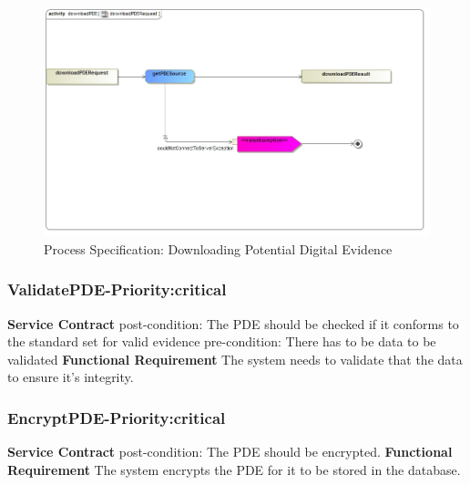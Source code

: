 \documentclass[a4paper,12pt]{article}
\begin{document}
\begin{figure}[H]
\includegraphics[width=\textwidth]{images/downloadPDERequest.jpg}
\caption{Process Specification: Downloading Potential Digital Evidence \label{overflow}}
\end{figure}	
\subsubsection{ValidatePDE-Priority:critical}
\textbf{Service Contract}\newline
post-condition: The PDE should be checked if it conforms to the standard set for valid evidence\newline
pre-condition: There has to be data to be validated\newline
\textbf{Functional Requirement}\newline
The system needs to validate that the data to ensure it's integrity.\newline
\subsubsection{EncryptPDE-Priority:critical}
\textbf{Service Contract}\newline
post-condition: The PDE should be encrypted.\newline
\textbf{Functional Requirement}\newline
	The system encrypts the PDE for it to be stored in the database.\newline
\end{document}
